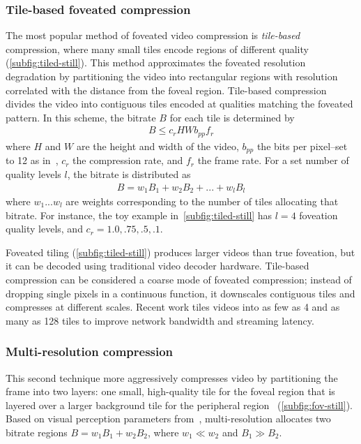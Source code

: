 \subsubsection{Tile-based foveated compression}
The most popular method of foveated video compression is \emph{tile-based} compression, where many small tiles encode regions of different quality (\ref{subfig:tiled-still}).
This method approximates the foveated resolution degradation by partitioning the video into rectangular regions with resolution correlated with the distance from the foveal region.
Tile-based compression divides the video into contiguous tiles encoded at qualities matching the foveated pattern.
In this scheme, the bitrate $B$ for each tile is determined by
\begin{align}
    B \leq c_{r}HWb_{pp}f_{r}
\end{align}
where $H$ and $W$ are the height and width of the video, $b_{pp}$ the bits per pixel--set to 12 as in~\cite{kaplanyan2019deepfovea}, $c_r$ the compression rate, and $f_r$ the frame rate.
For a set number of quality levels $l$, the bitrate is distributed as
\begin{align}
  B = w_{1}B_{1} + w_{2}B_{2} + ... + w_{l}B_{l}
\end{align}
where $w_{1} ... w_{l}$ are weights corresponding to the number of tiles allocating that bitrate.
For instance, the toy example in~\ref{subfig:tiled-still} has $l=4$ foveation quality levels, and $c_r = {1.0, .75, .5, .1}$.

Foveated tiling (\ref{subfig:tiled-still}) produces larger videos than true foveation, but it can be decoded using traditional video decoder hardware.
Tile-based compression can be considered a coarse mode of foveated compression; instead of dropping single pixels in a continuous function, it downscales contiguous tiles and compresses at different scales.
Recent work tiles videos into as few as 4 and as many as 128 tiles to improve network bandwidth and streaming latency.

\subsubsection{Multi-resolution compression} This second technique more aggressively compresses video by partitioning the frame into two layers: one small, high-quality tile for the foveal region that is layered over a larger background tile for the peripheral region~\cite{guenter2012foveated}  (\ref{subfig:fov-still}).
Based on visual perception parameters from~\cite{guenter2012foveated}, multi-resolution allocates two bitrate regions $B = w_{1}B_{1} + w_{2}B_{2}$, where $w_{1} \ll w_{2}$ and $B_{1} \gg B_{2}$.

